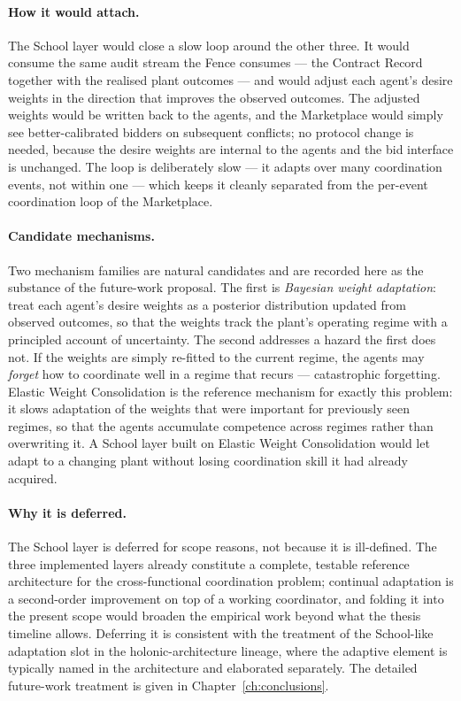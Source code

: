 \paragraph{How it would attach.}
The School layer would close a slow loop around the other three. It
would consume the same audit stream the Fence consumes --- the Contract
Record together with the realised plant outcomes --- and would adjust
each agent's desire weights in the direction that improves the observed
outcomes. The adjusted weights would be written back to the agents, and
the Marketplace would simply see better-calibrated bidders on
subsequent conflicts; no protocol change is needed, because the desire
weights are internal to the agents and the bid interface is unchanged.
The loop is deliberately slow --- it adapts over many coordination
events, not within one --- which keeps it cleanly separated from the
per-event coordination loop of the Marketplace.

\paragraph{Candidate mechanisms.}
Two mechanism families are natural candidates and are recorded here as
the substance of the future-work proposal. The first is \emph{Bayesian
weight adaptation}: treat each agent's desire weights as a posterior
distribution updated from observed outcomes, so that the weights track
the plant's operating regime with a principled account of uncertainty.
The second addresses a hazard the first does not. If the weights are
simply re-fitted to the current regime, the agents may \emph{forget}
how to coordinate well in a regime that recurs --- catastrophic
forgetting. Elastic Weight Consolidation \cite{kirkpatrick2017} is the
reference mechanism for exactly this problem: it slows adaptation of the
weights that were important for previously seen regimes, so that the
agents accumulate competence across regimes rather than overwriting it.
A School layer built on Elastic Weight Consolidation would let \NEXUS{}
adapt to a changing plant without losing coordination skill it had
already acquired.

\paragraph{Why it is deferred.}
The School layer is deferred for scope reasons, not because it is
ill-defined. The three implemented layers already constitute a complete,
testable reference architecture for the cross-functional coordination
problem; continual adaptation is a second-order improvement on top of a
working coordinator, and folding it into the present scope would broaden
the empirical work beyond what the thesis timeline allows. Deferring it
is consistent with the treatment of the School-like adaptation slot in
the holonic-architecture lineage, where the adaptive element is
typically named in the architecture and elaborated separately. The
detailed future-work treatment is given in
Chapter~\ref{ch:conclusions}.

